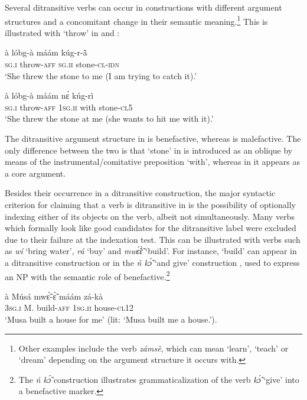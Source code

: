 \documentclass[output=paper]{langsci/langscibook}
\begin{document}
Several ditransitive verbs can occur in constructions with different argument structures and a concomitant change in their semantic meaning.\footnote{Other examples include the verb \textit{zámsè}, which can mean `learn', `teach' or `dream' depending on the argument structure it occurs with.} This is illustrated with `throw' in  and :  

\ea
\label{ex:3.pacchiarotti}
\gll à    lóbg-à    máám    kúg-r-\`{ã}\\
\textsc{sg.i}  throw-\textsc{aff}  \textsc{sg.ii}  stone-\textsc{cl-idn} \\
\glt `She threw the stone to me (I am trying to catch it).'  
\z

\ea
\label{ex:4.pacchiarotti}
\gll à    lóbg-à    máám    nɛ́  kúg-rì \\
\textsc{sg.i}    throw-\textsc{aff}  \textsc{1sg.ii}    with  stone-\textsc{cl5} \\
\glt `She threw the stone at me (she wants to hit me with it).'
\z

The ditransitive argument structure in  is benefactive, whereas  is malefactive. The only difference between the two is that `stone' in  is introduced as an oblique by means of the instrumental/comitative preposition `with', whereas in  it appears as a core argument. 

Besides their occurrence in a ditransitive construction, the major syntactic criterion for claiming that a verb is ditransitive in  is the possibility of optionally indexing either of its objects on the verb, albeit not simultaneously. Many verbs which formally look like good candidates for the ditransitive label were excluded due to their failure at the indexation test. This can be illustrated with verbs such as \textit{wí} `bring water', \textit{rá} `buy' and \textit{mw\'{\~{ɛ}}\`{\~{ɛ}}} `build'. For instance, `build' can appear in a ditransitive construction  or in the \textit{ń k\'{\~{ɔ}}} `and give' construction , used to express an NP with the semantic role of benefactive.\footnote{The\textit{ ń k\'{\~{ɔ}}} construction illustrates grammaticalization of the verb \textit{k\'{\~{ɔ}}} `give' into a benefactive marker.} 

\ea
\label{ex:5.pacchiarotti}
\gll à    Músá  mwɛ̃́-ɛ̃̀    máám    zá-kà \\
\textsc{3sg.i}    M.  build-\textsc{aff}  \textsc{1sg.ii}    house-\textsc{cl12} \\
\glt `Musa built a house for me' (lit: `Musa built me a house.'). 
\z
\end{document}

